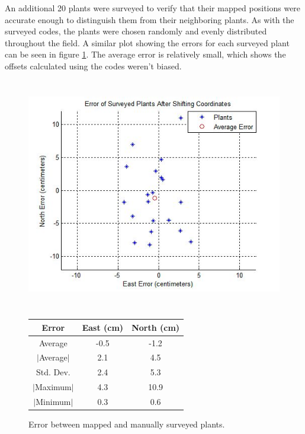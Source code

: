 An additional 20 plants were surveyed to verify that their mapped positions were accurate enough to distinguish them from their neighboring plants.  As with the surveyed codes, the plants were chosen randomly and evenly distributed throughout the field.   A similar plot showing the errors for each surveyed plant can be seen in figure \ref{figure:plant_errors}.  The average error is relatively small, which shows the offsets calculated using the codes weren't biased.   

  \begin{figure}
	\centering
    \includegraphics[height=4in]{figures/plant_errors.jpg}
    \newline
    \newline
    \centering
    \begin{tabular}[c]{|c|c|c|}
        \hline
        Error & East (cm) & North (cm) \\ 
        \hline
        Average   & -0.5 & -1.2           \\
        $|$Average$|$ & 2.1 & 4.5       \\
        Std. Dev. & 2.4 & 5.3       \\
        $|$Maximum$|$   & 4.3 & 10.9       \\
        $|$Minimum$|$   & 0.3 & 0.6       \\
        \hline
    \end{tabular}
    \captionsetup{labelformat=andtable}
    \caption[Errors in surveyed plants]{Error between mapped and manually surveyed plants.}
    \label{figure:plant_errors}
  \end{figure}

